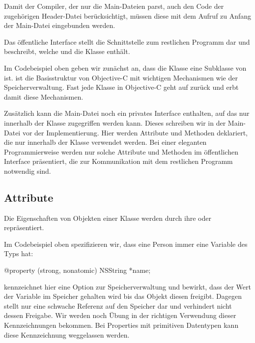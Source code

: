 \documentclass[parskip=half, final]{scrreprt}
\begin{document}
Damit der Compiler, der nur die Main-Dateien parst, auch den Code der zugehörigen Header-Datei berücksichtigt, müssen diese mit dem Aufruf  zu Anfang der Main-Datei eingebunden werden.

Das öffentliche Interface stellt die Schnittstelle zum restlichen Programm dar und beschreibt, welche  und  die Klasse enthält.

Im Codebeispiel oben geben wir zunächst an, dass die Klasse  eine Subklasse von  ist.  ist die Basisstruktur von Objective-C mit wichtigen Mechanismen wie der Speicherverwaltung. Fast jede Klasse in Objective-C geht auf  zurück und erbt damit diese Mechanismen.

Zusätzlich kann die Main-Datei noch ein privates Interface enthalten, auf das nur innerhalb der Klasse zugegriffen werden kann. Dieses schreiben wir in der Main-Datei vor der Implementierung. Hier werden Attribute und Methoden deklariert, die nur innerhalb der Klasse verwendet werden. Bei einer eleganten Programmierweise werden nur solche Attribute und Methoden im öffentlichen Interface präsentiert, die zur Kommunikation mit dem restlichen Programm notwendig sind.

\subsection{Attribute}\label{sec:properties}

Die Eigenschaften von Objekten einer Klasse werden durch ihre  oder  repräsentiert.

Im Codebeispiel oben  spezifizieren wir, dass eine Person immer eine Variable  des Typs  hat:

\begin{objclst}
@property (strong, nonatomic) NSString *name;
\end{objclst}

 kennzeichnet hier eine Option zur Speicherverwaltung und bewirkt, dass der Wert der Variable im Speicher gehalten wird bis das Objekt diesen freigibt. Dagegen stellt  nur eine schwache Referenz auf den Speicher dar und verhindert nicht dessen Freigabe. Wir werden noch Übung in der richtigen Verwendung dieser Kennzeichnungen bekommen. Bei Properties mit primitiven Datentypen kann diese Kennzeichnung weggelassen werden.
\end{document}
